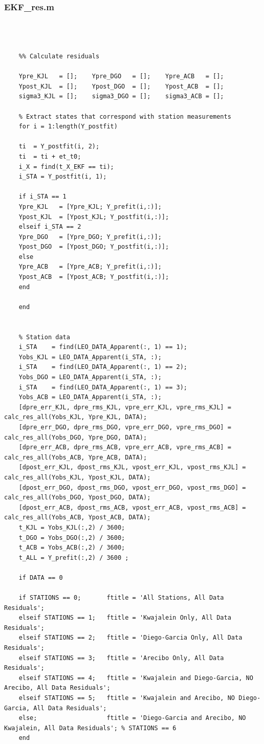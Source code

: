 \documentclass[conf]{new-aiaa}
\begin{document}
\subsubsection{EKF\_res.m}
\begin{lstlisting}
	
	
	
	%% Calculate residuals 
	
	Ypre_KJL   = [];    Ypre_DGO   = [];    Ypre_ACB   = []; 
	Ypost_KJL  = [];    Ypost_DGO  = [];    Ypost_ACB  = []; 
	sigma3_KJL = [];    sigma3_DGO = [];    sigma3_ACB = []; 
	
	% Extract states that correspond with station measurements 
	for i = 1:length(Y_postfit)
	
	ti  = Y_postfit(i, 2); 
	ti  = ti + et_t0; 
	i_X = find(t_X_EKF == ti); 
	i_STA = Y_postfit(i, 1); 
	
	if i_STA == 1
	Ypre_KJL   = [Ypre_KJL; Y_prefit(i,:)]; 
	Ypost_KJL  = [Ypost_KJL; Y_postfit(i,:)];  
	elseif i_STA == 2
	Ypre_DGO   = [Ypre_DGO; Y_prefit(i,:)]; 
	Ypost_DGO  = [Ypost_DGO; Y_postfit(i,:)];  
	else
	Ypre_ACB   = [Ypre_ACB; Y_prefit(i,:)]; 
	Ypost_ACB  = [Ypost_ACB; Y_postfit(i,:)];  
	end 
	
	end 
	
	
	% Station data 
	i_STA    = find(LEO_DATA_Apparent(:, 1) == 1); 
	Yobs_KJL = LEO_DATA_Apparent(i_STA, :); 
	i_STA    = find(LEO_DATA_Apparent(:, 1) == 2); 
	Yobs_DGO = LEO_DATA_Apparent(i_STA, :);
	i_STA    = find(LEO_DATA_Apparent(:, 1) == 3); 
	Yobs_ACB = LEO_DATA_Apparent(i_STA, :);
	[dpre_err_KJL, dpre_rms_KJL, vpre_err_KJL, vpre_rms_KJL] = calc_res_all(Yobs_KJL, Ypre_KJL, DATA); 
	[dpre_err_DGO, dpre_rms_DGO, vpre_err_DGO, vpre_rms_DGO] = calc_res_all(Yobs_DGO, Ypre_DGO, DATA); 
	[dpre_err_ACB, dpre_rms_ACB, vpre_err_ACB, vpre_rms_ACB] = calc_res_all(Yobs_ACB, Ypre_ACB, DATA); 
	[dpost_err_KJL, dpost_rms_KJL, vpost_err_KJL, vpost_rms_KJL] = calc_res_all(Yobs_KJL, Ypost_KJL, DATA); 
	[dpost_err_DGO, dpost_rms_DGO, vpost_err_DGO, vpost_rms_DGO] = calc_res_all(Yobs_DGO, Ypost_DGO, DATA); 
	[dpost_err_ACB, dpost_rms_ACB, vpost_err_ACB, vpost_rms_ACB] = calc_res_all(Yobs_ACB, Ypost_ACB, DATA); 
	t_KJL = Yobs_KJL(:,2) / 3600; 
	t_DGO = Yobs_DGO(:,2) / 3600; 
	t_ACB = Yobs_ACB(:,2) / 3600; 
	t_ALL = Y_prefit(:,2) / 3600 ; 
	
	if DATA == 0
	
	if STATIONS == 0;       ftitle = 'All Stations, All Data Residuals'; 
	elseif STATIONS == 1;   ftitle = 'Kwajalein Only, All Data Residuals'; 
	elseif STATIONS == 2;   ftitle = 'Diego-Garcia Only, All Data Residuals'; 
	elseif STATIONS == 3;   ftitle = 'Arecibo Only, All Data Residuals';    
	elseif STATIONS == 4;   ftitle = 'Kwajalein and Diego-Garcia, NO Arecibo, All Data Residuals'; 
	elseif STATIONS == 5;   ftitle = 'Kwajalein and Arecibo, NO Diego-Garcia, All Data Residuals'; 
	else;                   ftitle = 'Diego-Garcia and Arecibo, NO Kwajalein, All Data Residuals'; % STATIONS == 6  
	end
	

\end{lstlisting}
\end{document}
